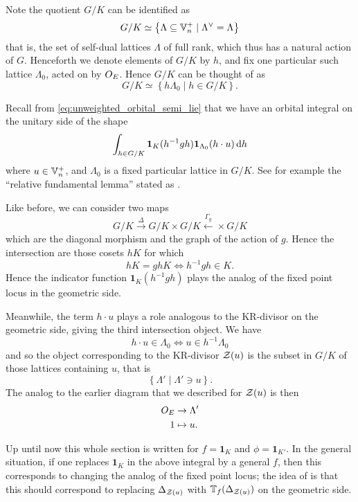Note the quotient $G/K$ can be identified as
\[ G/K \simeq \left\{ \Lambda \subseteq \mathbb V_n^+ \mid \Lambda^\vee = \Lambda \right\} \]
that is, the set of self-dual lattices $\Lambda$ of full rank,
which thus has a natural action of $G$.
Henceforth we denote elements of $G/K$ by $h$,
and fix one particular such lattice $\Lambda_0$, acted on by $O_E$.
Hence $G/K$ can be thought of as
\[ G/K \simeq \left\{ h \Lambda_0 \mid h \in G/K \right\}. \]

Recall from \eqref{eq:unweighted_orbital_semi_lie}
that we have an orbital integral on the unitary side of the shape
\[ \int_{h \in G/K} \mathbf{1}_K(h^{-1} g h) \mathbf{1}_{\Lambda_0}(h \cdot u) \odif h \]
where $u \in \mathbb V_n^+$, and $\Lambda_0$ is a fixed particular lattice in $G/K$.
See for example the ``relative fundamental lemma''
stated as \cite[Conjecture 1.9]{ref:liuFJ}.

Like before, we can consider two maps
\[ G/K \xrightarrow{\Delta} G/K \times G/K \xleftarrow{\Gamma_g} \times G/K \]
which are the diagonal morphism and the graph of the action of $g$.
Hence the intersection are those cosets $hK$ for which
\[ hK = ghK \iff h^{-1} g h \in K. \]
Hence the indicator function $\mathbf{1}_K(h^{-1} g h)$
plays the analog of the fixed point locus in the geometric side.

Meanwhile, the term $h \cdot u$ plays a role analogous
to the KR-divisor on the geometric side, giving the third intersection object.
We have
\[ h \cdot u \in \Lambda_0 \iff u \in h^{-1} \Lambda_0 \]
and so the object corresponding to the KR-divisor $\mathcal Z(u)$
is the subset in $G/K$ of those lattices containing $u$, that is
\[ \left\{ \Lambda' \mid \Lambda' \ni u \right\}. \]
The analog to the earlier diagram that we described for $\mathcal Z(u)$ is then
\begin{align*}
  O_E &\to \Lambda' \\
  1 &\mapsto u.
\end{align*}

Up until now this whole section is written for $f = \mathbf{1}_K$ and $\phi = \mathbf{1}_{K'}$.
In the general situation,
if one replaces $\mathbf{1}_K$ in the above integral by a general $f$,
then this corresponds to changing the analog of the fixed point locus;
the idea of \cite{ref:AFLspherical} is that
this should correspond to replacing $\Delta_{\mathcal Z(u)}$
with $\mathbb T_f(\Delta_{\mathcal Z(u)})$ on the geometric side.
